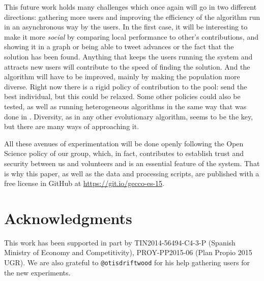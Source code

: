 \documentclass[runningheads,a4paper]{llncs}\usepackage[]{graphicx}\usepackage[]{color}
\begin{document}
This future work holds many challenges which once again will go in two
different directions: gathering more users and improving the
efficiency of the algorithm run in an asynchronous way by the
users. In the first case, it will be interesting to make it more {\em
  social} by comparing local performance to other's contributions, and
showing it in a graph or being able to tweet advances or the fact that
the solution has been found. Anything that keeps the users running the
system and attracts new users will contribute to the speed of finding
the solution. And the algorithm will have to be improved, mainly by
making the population more diverse. Right now there is a rigid policy
of contribution to the pool: send the best individual, but this could
be relaxed. Some other policies could also be tested, as well as
running heterogeneous algorithms in the same way that was done in
\cite{DBLP:journals/grid/ValdezTGVO15}. Diversity, as in any other
evolutionary algorithm, seems to be the key, but there are many ways of
approaching it. 

All these avenues of experimentation will be done openly following the
Open Science policy of our group, which, in fact, contributes to
establish trust and security between us and volunteers and is an
essential feature of the system. That is why this paper, as well as
the data and processing scripts, are published with a free license in GitHub at
\url{https://git.io/gecco-es-15}.

\section*{Acknowledgments}

This work has been supported in part by TIN2014-56494-C4-3-P (Spanish
Ministry of Economy and Competitivity), PROY-PP2015-06 (Plan Propio
2015 UGR). We are also grateful to {\tt @otisdriftwood} for his help
gathering users for the new experiments.




\end{document}
